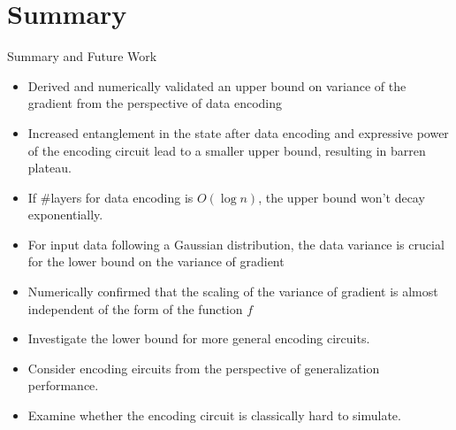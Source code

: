 \documentclass[dvipdfmx,10pt,aspectratio=169]{beamer}
\begin{document}
\section{Summary}
\begin{frame}{Summary and Future Work}
    \vspace*{-15pt}
    \hspace*{-50pt}

    \begin{center}
        {\large\colorbox{blue!40}{}}
    \end{center}

    \begin{itemize}
        \item Derived and numerically validated an upper bound on variance of the gradient from the perspective of data encoding
        \item Increased entanglement in the state after data encoding and expressive power of the encoding circuit lead to a smaller upper bound, resulting in barren plateau.
        \item If \#layers for data encoding is $O(\log{n})$, the upper bound won't decay exponentially.
        \item For input data following a Gaussian distribution, the data variance is crucial for the lower bound on the variance of gradient
        \item Numerically confirmed that the scaling of the variance of gradient is almost independent of the form of the function $f$
    \end{itemize}

    \begin{center}
        {\large\colorbox{blue!40}{}}
    \end{center}

    \begin{itemize}
        \item Investigate the lower bound for more general encoding circuits.
        \item Consider encoding eircuits from the perspective of generalization performance.
        \item Examine whether the encoding circuit is classically hard to simulate.
    \end{itemize}
\end{frame}
\end{document}

